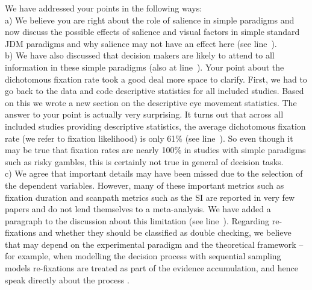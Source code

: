 We have addressed your points in the following ways:\\
a) We believe you are right about the role of salience in simple paradigms and now discuss the possible effects of salience and visual factors in simple standard JDM paradigms and why salience may not have an effect here (see line~).\\ 
b) We have also discussed that decision makers are likely to attend to all information in these simple paradigms (also at line~). Your point about the dichotomous fixation rate took a good deal more space to clarify. First, we had to go back to the data and code descriptive statistics for all included studies. Based on this we wrote a new section on the descriptive eye movement statistics. The answer to your point is actually very surprising. It turns out that across all included studies providing descriptive statistics, the average dichotomous fixation rate (we refer to fixation likelihood) is only 61\% (see line~). So even though it may be true that fixation rates are nearly 100\% in studies with simple paradigms such as risky gambles, this is certainly not true in general of decision tasks.\\ 
c) We agree that important details may have been missed due to the selection of the dependent variables. However, many of these important metrics such as fixation duration and scanpath metrics such as the SI are reported in very few papers and do not lend themselves to a meta-analysis. We have added a paragraph to the discussion about this limitation (see line~). Regarding re-fixations and whether they should be classified as double checking, we believe that may depend on the experimental paradigm and the theoretical framework -- for example, when modelling the decision process with sequential sampling models re-fixations are treated as part of the evidence accumulation, and hence speak directly about the process \citep[e.g.][]{krajbich2010a}. 



